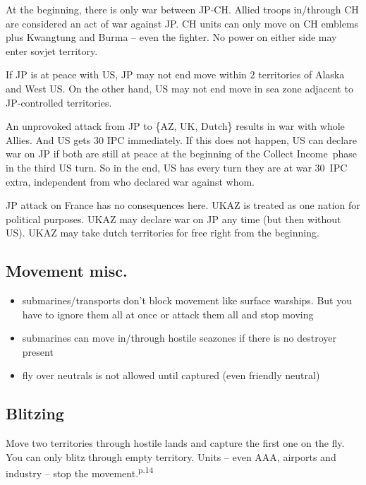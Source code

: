 \documentclass[10pt,twoside]{article}
\begin{document}
\begin{multicols*}{3}
At the beginning, there is only war between JP-CH. Allied troops in/through CH are considered an act of war against JP. CH units can only move on CH emblems plus Kwangtung and Burma -- even the fighter. No power on either side may enter sovjet territory.

If JP is at peace with US, JP may not end move within 2 territories of Alaska and West US. On the other hand, US may not end move in sea zone adjacent to JP-controlled territories. 

An unprovoked attack from JP to \{AZ, UK, Dutch\} results in war with whole Allies. And US gets 30 IPC immediately. If this does not happen, US can declare war on JP if both are still at peace at the beginning of the \glqq Collect Income\grqq\ phase in the third US turn. So in the end, US has every turn they are at war 30~IPC extra, independent from who declared war against whom.

JP attack on France has no consequences here. UKAZ is treated as one nation for political purposes. UKAZ may declare war on JP any time (but then without US).
UKAZ may take dutch territories for free right from the beginning.


\subsection*{Movement misc.}
\begin{itemize}
\item submarines/transports don't block movement like surface warships. But you have to ignore them all at once or attack them all and stop moving
\item submarines can move in/through hostile seazones if there is no destroyer present
\item fly over neutrals is not allowed until captured (even friendly neutral)
\end{itemize}

\subsection*{Blitzing}
Move two territories through hostile lands and capture the first one on the fly. You can only blitz through empty territory. Units -- even AAA, airports and industry -- stop the movement.\textsuperscript{p.14}


\end{multicols*}
\end{document}
